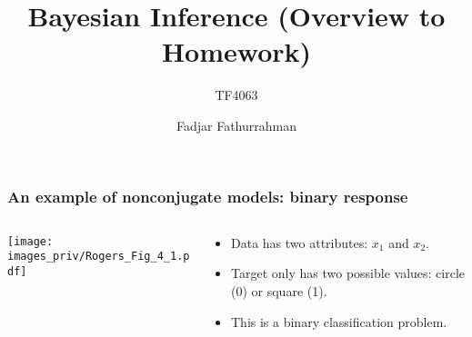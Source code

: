 \documentclass[english,10pt,aspectratio=169,fleqn]{beamer}
\begin{document}
\title{Bayesian Inference (Overview to Homework)}
\subtitle{TF4063}
\author{Fadjar Fathurrahman}
\date{}


\frame{\titlepage}


\begin{frame} %
\frametitle{An example of nonconjugate models: binary response}

\begin{columns}

\begin{column}{0.5\textwidth}
{\centering
\texttt{[image: images\_priv/Rogers\_Fig\_4\_1.pdf]}
\par}
\end{column}

\begin{column}{0.5\textwidth}
\begin{itemize}
\item Data has two attributes: $x_1$ and $x_2$.
\item Target only has two possible values: circle (0) or square (1).
\item This is a binary classification problem.
\end{itemize}
\end{column}

\end{columns}

\end{frame} %
\end{document}

